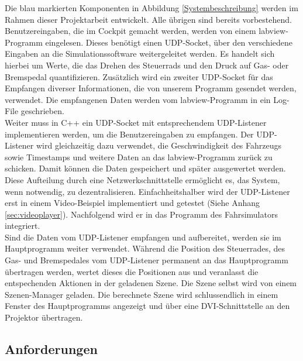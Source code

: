 Die blau markierten Komponenten in Abbildung \ref{Systembeschreibung} werden im Rahmen dieser Projektarbeit entwickelt. Alle übrigen sind bereits vorbestehend. \\
Benutzereingaben, die im Cockpit gemacht werden, werden von einem \gls{labview}-Programm eingelesen. Dieses benötigt einen UDP-Socket, über den verschiedene Eingaben an die Simulationssoftware weitergeleitet werden. Es handelt sich hierbei um Werte, die das Drehen des Steuerrads und den Druck auf Gas- oder Bremspedal quantifizieren. Zusätzlich wird ein zweiter UDP-Socket für das Empfangen diverser Informationen, die von unserem Programm gesendet werden, verwendet. Die empfangenen Daten werden vom \gls{labview}-Programm in ein Log-File geschrieben.\\
Weiter muss in C++ ein UDP-Socket mit entsprechendem UDP-Listener implementieren werden, um die Benutzereingaben zu empfangen. Der UDP-Listener wird gleichzeitig dazu verwendet, die Geschwindigkeit des Fahrzeugs sowie Timestamps und weitere Daten an das \gls{labview}-Programm zurück zu schicken. Damit können die Daten gespeichert und später ausgewertet werden.\\
Diese Aufteilung durch eine Netzwerkschnittstelle ermöglicht es,  das System, wenn notwendig, zu dezentralisieren. Einfachheitshalber wird der UDP-Listener erst in einem Video-Beispiel implementiert und getestet (Siehe Anhang \ref{sec:videoplayer}). Nachfolgend wird er in das Programm des Fahrsimulators integriert.\\
Sind die Daten vom UDP-Listener empfangen und aufbereitet, werden sie im Hauptprogramm weiter verwendet. Während die Position des Steuerrades, des Gas- und Bremspedales vom UDP-Listener permanent an das Hauptprogramm übertragen werden, wertet dieses die Positionen aus und veranlasst die entspechenden Aktionen in der geladenen Szene. 
Die Szene selbst wird von einem Szenen-Manager geladen. Die berechnete Szene wird schlussendlich in einem Fenster des Hauptprogramms angezeigt und über eine DVI-Schnittstelle an den Projektor übertragen.

\subsection{Anforderungen}
